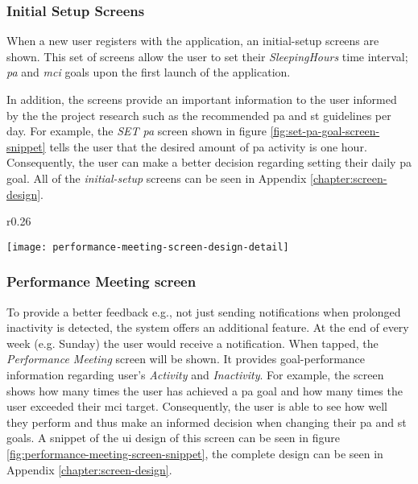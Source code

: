     \subsubsection{Initial Setup Screens}
    \label{section:initial-setup-screens}
    When a new user registers with the application, an initial-setup screens are shown. This set of screens allow the user to set their \textit{SleepingHours} time interval; \textit{\gls{pa}} and \textit{\gls{mci}} goals upon the first launch of the application.

    In addition, the screens provide an important information to the user informed by the the project research such as the recommended \gls{pa} and \gls{st} guidelines per day. For example, the \textit{SET \gls{pa} } screen shown in figure \ref{fig:set-pa-goal-screen-snippet} tells the user that the desired amount of \gls{pa} activity is one hour. Consequently, the user can make a better decision regarding setting their daily \gls{pa} goal. All of the \textit{initial-setup} screens can be seen in Appendix \ref{chapter:screen-design}.
    
    \newpage
     \begin{wrapfigure}[10]{r}{0.26\textwidth}
    \begin{center}
    \texttt{[image: performance-meeting-screen-design-detail]}
    \end{center}
    \caption{Performance Meeting screen snippet}
    \label{fig:performance-meeting-screen-snippet}
    \end{wrapfigure}
    
    \subsubsection{Performance Meeting screen}
    To provide a better feedback e.g., not just sending notifications when prolonged inactivity is detected, the system offers an additional feature. At the end of every week (e.g. Sunday) the user would receive a notification. When tapped, the \textit{Performance Meeting} screen will be shown. It provides goal-performance information regarding user's \textit{Activity} and \textit{Inactivity}. For example, the screen shows how many times the user has achieved a \gls{pa} goal and how many times the user exceeded their \gls{mci} target. Consequently, the user is able to see how well they perform and thus make an informed decision when changing their \gls{pa} and \gls{st} goals. A snippet of the \gls{ui} design of this screen can be seen in figure \ref{fig:performance-meeting-screen-snippet}, the complete design can be seen in Appendix \ref{chapter:screen-design}.
    
    




    
    
    